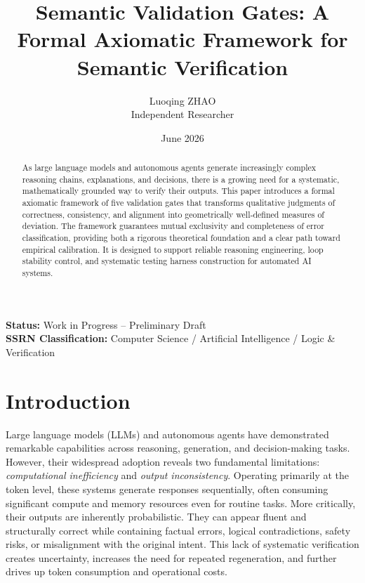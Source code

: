 \documentclass[11pt,a4paper]{article}
\title{Semantic Validation Gates: A Formal Axiomatic Framework for Semantic Verification}
\author{Luoqing ZHAO\\Independent Researcher}
\date{June 2026}
\theoremstyle{plain}
\begin{document}
	
	\maketitle
	
	\noindent\textbf{Status:} Work in Progress – Preliminary Draft\\
	\textbf{SSRN Classification:} Computer Science / Artificial Intelligence / Logic \& Verification
	
	\vspace{1em}
	
	\begin{abstract}
As large language models and autonomous agents generate increasingly complex reasoning chains, explanations, and decisions, there is a growing need for a systematic, mathematically grounded way to verify their outputs. This paper introduces a formal axiomatic framework of five validation gates that transforms qualitative judgments of correctness, consistency, and alignment into geometrically well‑defined measures of deviation. The framework guarantees mutual exclusivity and completeness of error classification, providing both a rigorous theoretical foundation and a clear path toward empirical calibration. It is designed to support reliable reasoning engineering, loop stability control, and systematic testing harness construction for automated AI systems.

	\end{abstract}
	
	\section{Introduction}
	
	Large language models (LLMs) and autonomous agents have demonstrated remarkable capabilities across reasoning, generation, and decision-making tasks. However, their widespread adoption reveals two fundamental limitations: \textit{computational inefficiency} and \textit{output inconsistency}. Operating primarily at the token level, these systems generate responses sequentially, often consuming significant compute and memory resources even for routine tasks. More critically, their outputs are inherently probabilistic. They can appear fluent and structurally correct while containing factual errors, logical contradictions, safety risks, or misalignment with the original intent. This lack of systematic verification creates uncertainty, increases the need for repeated regeneration, and further drives up token consumption and operational costs.
	
\end{document}

